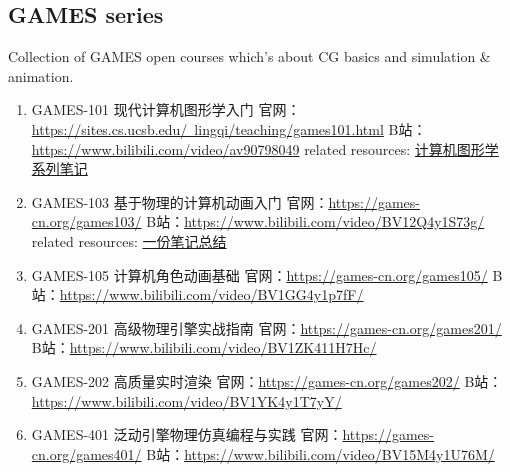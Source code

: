 \documentclass{article}
\begin{document}
\subsection{GAMES series}
\par Collection of GAMES open courses which's about CG basics and simulation \& animation.
\begin{enumerate}
    \item GAMES-101 现代计算机图形学入门 \newline 官网：\href{https://sites.cs.ucsb.edu/~lingqi/teaching/games101.html}{https://sites.cs.ucsb.edu/~lingqi/teaching/games101.html} \newline B站：\href{https://www.bilibili.com/video/av90798049}{https://www.bilibili.com/video/av90798049} \newline related resources: \href{https://www.zhihu.com/column/c_1249465121615204352}{计算机图形学系列笔记}
    \item GAMES-103 基于物理的计算机动画入门 \newline 官网：\href{https://games-cn.org/games103/}{https://games-cn.org/games103/} \newline B站：\href{https://www.bilibili.com/video/BV12Q4y1S73g/}{https://www.bilibili.com/video/BV12Q4y1S73g/} \newline related resources: \href{https://www.zhihu.com/column/c_1481545880260513792}{一份笔记总结}
    \item GAMES-105 计算机角色动画基础 \newline 官网：\href{https://games-cn.org/games105/}{https://games-cn.org/games105/} \newline B站：\href{https://www.bilibili.com/video/BV1GG4y1p7fF/}{https://www.bilibili.com/video/BV1GG4y1p7fF/}
    \item GAMES-201 高级物理引擎实战指南 \newline 官网：\href{https://games-cn.org/games201/}{https://games-cn.org/games201/} \newline B站：\href{https://www.bilibili.com/video/BV1ZK411H7Hc/}{https://www.bilibili.com/video/BV1ZK411H7Hc/}
    \item GAMES-202 高质量实时渲染 \newline 官网：\href{https://games-cn.org/games202/}{https://games-cn.org/games202/} \newline B站：\href{https://www.bilibili.com/video/BV1YK4y1T7yY/}{https://www.bilibili.com/video/BV1YK4y1T7yY/} 
    \item GAMES-401 泛动引擎物理仿真编程与实践 \newline 官网：\href{https://games-cn.org/games401/}{https://games-cn.org/games401/} \newline B站：\href{https://www.bilibili.com/video/BV15M4y1U76M/}{https://www.bilibili.com/video/BV15M4y1U76M/}
\end{enumerate}
\end{document}

